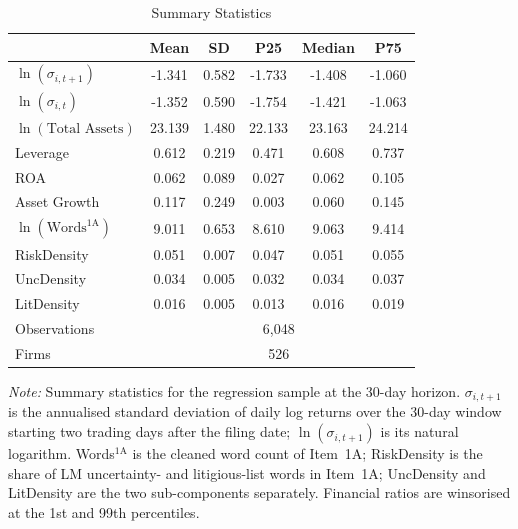 \begin{table}[htbp]
\centering
\caption{Summary Statistics}
\label{tab:summary}
\begin{tabular}{lccccc}
\toprule
 & Mean & SD & P25 & Median & P75 \\
\midrule
$\ln(\sigma_{i,t+1})$ & -1.341 & 0.582 & -1.733 & -1.408 & -1.060 \\
$\ln(\sigma_{i,t})$ & -1.352 & 0.590 & -1.754 & -1.421 & -1.063 \\
$\ln(\text{Total Assets})$ & 23.139 & 1.480 & 22.133 & 23.163 & 24.214 \\
Leverage & 0.612 & 0.219 & 0.471 & 0.608 & 0.737 \\
ROA & 0.062 & 0.089 & 0.027 & 0.062 & 0.105 \\
Asset Growth & 0.117 & 0.249 & 0.003 & 0.060 & 0.145 \\
$\ln(\text{Words}^{\text{1A}})$ & 9.011 & 0.653 & 8.610 & 9.063 & 9.414 \\
RiskDensity & 0.051 & 0.007 & 0.047 & 0.051 & 0.055 \\
UncDensity & 0.034 & 0.005 & 0.032 & 0.034 & 0.037 \\
LitDensity & 0.016 & 0.005 & 0.013 & 0.016 & 0.019 \\
\midrule
Observations & \multicolumn{5}{c}{6,048} \\
Firms & \multicolumn{5}{c}{526} \\
\bottomrule
\end{tabular}
\par\smallskip
\noindent\footnotesize 
\textit{Note:} Summary statistics for the regression sample at the 30-day horizon. $\sigma_{i,t+1}$ is the annualised standard deviation of daily log returns over the 30-day window starting two trading days after the filing date; $\ln(\sigma_{i,t+1})$ is its natural logarithm. Words$^{\text{1A}}$ is the cleaned word count of Item~1A; RiskDensity is the share of LM uncertainty- and litigious-list words in Item~1A; UncDensity and LitDensity are the two sub-components separately. Financial ratios are winsorised at the 1st and 99th percentiles.
\end{table}